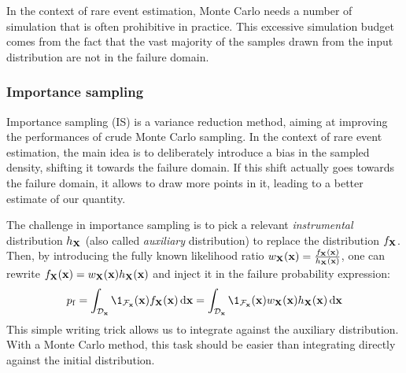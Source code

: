 In the context of rare event estimation, Monte Carlo needs a number of simulation that is often prohibitive in practice. 
This excessive simulation budget comes from the fact that the vast majority of the samples drawn from the input distribution are not in the failure domain.


\subsubsection{Importance sampling}

Importance sampling (IS) is a variance reduction method, aiming at improving the performances of crude Monte Carlo sampling. 
In the context of rare event estimation, the main idea is to deliberately introduce a bias in the sampled density, shifting it towards the failure domain. 
If this shift actually goes towards the failure domain, it allows to draw more points in it, leading to a better estimate of our quantity.

The challenge in importance sampling is to pick a relevant \textit{instrumental} distribution $h_{\bf X}$ (also called \textit{auxiliary} distribution) to replace the distribution $f_{\bf X}$. 
Then, by introducing the fully known likelihood ratio $w_{\bf X}({\bf x}) = \frac{f_{\bf X}({\bf x})}{h_{\bf X}({\bf x})}$, one can rewrite $f_{\bf X}({\bf x}) = w_{\bf X}({\bf x}) h_{\bf X}({\bf x})$ and inject it in the failure probability expression: 
\begin{equation}
    \pf = \int_{\iD_\bx} \1_{\iF_\bx}(\bx) f_\bX(\bx) \, \dd\bx
        = \int_{\iD_\bx} \1_{\iF_\bx}(\bx) w_\bX(\bx) h_\bX(\bx) \, \dd\bx
\end{equation}
This simple writing trick allows us to integrate against the auxiliary distribution. 
With a Monte Carlo method, this task should be easier than integrating directly against the initial distribution.

